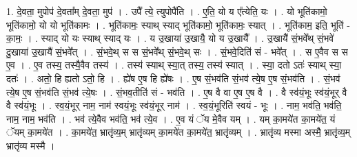 \documentclass[17pt]{extarticle}
\begin{document}
1. दे॒वता॒ मुपोप॑ दे॒वता᳚म् दे॒वता॒ मुप॑ । . उपै᳚ त्ये॒ त्युपोपै॑ति । . ए॒ति॒ यो य ए᳚त्येति॒ यः । . यो भूति॑कामो॒ भूति॑कामो॒ यो यो भूति॑कामः । . भूति॑कामः॒ स्याथ् स्याद् भूति॑कामो॒ भूति॑कामः॒ स्यात् । . भूति॑काम॒ इति॒ भूति॑ - का॒मः॒ । . स्याद् यो यः स्याथ् स्याद् यः । . य उ॒खाया॑ उ॒खायै॒ यो य उ॒खायै᳚ । . उ॒खायै॑ सं॒भवे᳚थ् सं॒भवे॑ दु॒खाया॑ उ॒खायै॑ सं॒भवे᳚त् । . सं॒भवे॒थ् स स सं॒भवे᳚थ् सं॒भवे॒थ् सः । . सं॒भवे॒दिति॑ सं - भवे᳚त् । . स ए॒वैव स स ए॒व । . ए॒व तस्य॒ तस्यै॒वैव तस्य॑ । . तस्य॑ स्याथ् स्या॒त् तस्य॒ तस्य॑ स्यात् । . स्या॒ दतो ऽतः॑ स्याथ् स्या॒ दतः॑ । . अतो॒ हि ह्यतो ऽतो॒ हि । . ह्ये॑ष ए॒ष हि ह्ये॑षः । . ए॒ष सं॒भव॑ति सं॒भव॑ त्ये॒ष ए॒ष सं॒भव॑ति । . सं॒भव॑ त्ये॒ष ए॒ष सं॒भव॑ति सं॒भव॑ त्ये॒षः । . सं॒भव॒तीति॑ सं - भव॑ति । . ए॒ष वै वा ए॒ष ए॒ष वै । . वै स्व॑यं॒भूः स्व॑यं॒भूर् वै वै स्व॑यं॒भूः । . स्व॒यं॒भूर् नाम॒ नाम॑ स्वयं॒भूः स्व॑यं॒भूर् नाम॑ । . स्व॒यं॒भूरिति॑ स्वयं - भूः । . नाम॒ भव॑ति॒ भव॑ति॒ नाम॒ नाम॒ भव॑ति । . भव॑ त्ये॒वैव भव॑ति॒ भव॑ त्ये॒व । . ए॒व यं ॅय मे॒वैव यम् । . यम् का॒मये॑त का॒मये॑त॒ यं ॅयम् का॒मये॑त । . का॒मये॑त॒ भ्रातृ॑व्य॒म् भ्रातृ॑व्यम् का॒मये॑त का॒मये॑त॒ भ्रातृ॑व्यम् । . भ्रातृ॑व्य मस्मा अस्मै॒ भ्रातृ॑व्य॒म् भ्रातृ॑व्य मस्मै । \newline
\end{document}

